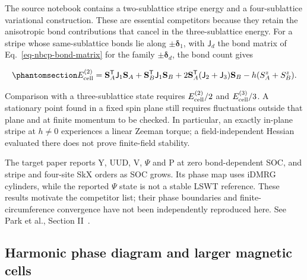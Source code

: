 The source notebook contains a two-sublattice stripe energy and a
four-sublattice variational construction. These are essential
competitors because they retain the anisotropic bond contributions that
cancel in the three-sublattice energy. For a stripe whose
same-sublattice bonds lie along \(\pm\boldsymbol\delta_1\), with
\(\mathsf J_d\) the bond matrix of Eq.~\eqref{eq-nbcp-bond-matrix} for the
family \(\pm\boldsymbol\delta_d\), the bond count gives

\begin{equation}\phantomsection\label{eq-nbcp-stripe-energy}{
E^{(2)}_{\rm cell}=\mathbf S_A^{\mathsf T}\mathsf J_1\mathbf S_A
+\mathbf S_B^{\mathsf T}\mathsf J_1\mathbf S_B
+2\mathbf S_A^{\mathsf T}(\mathsf J_2+\mathsf J_3)\mathbf S_B
-h(S_A^z+S_B^z).
}\end{equation}

Comparison with a three-sublattice state requires
\(E^{(2)}_{\rm cell}/2\) and \(E^{(3)}_{\rm cell}/3\). A stationary
point found in a fixed spin plane still requires fluctuations outside
that plane and at finite momentum to be checked. In particular, an
exactly in-plane stripe at \(h\ne0\) experiences a linear Zeeman torque;
a field-independent Hessian evaluated there does not prove finite-field
stability.

The target paper reports Y, UUD, V, \(\Psi\) and P at zero
bond-dependent SOC, and stripe and four-site SkX orders as SOC grows.
Its phase map uses iDMRG cylinders, while the reported \(\Psi\) state is
not a stable LSWT reference. These results motivate the competitor list;
their phase boundaries and finite-circumference convergence have not
been independently reproduced here. See
Park et al., Section II~\cite{park2026}.

\subsection{Harmonic phase diagram and larger magnetic
cells}\label{sec-nbcp-harmonic-phase-diagram}

